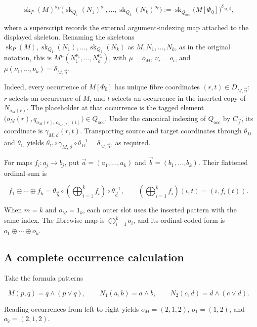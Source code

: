 \documentclass[11pt]{article}
\newcommand{\finord}[1]{\underline{#1}}
\begin{document}
\[
\operatorname{sk}_P(M)^{o_M}
\bigl(\operatorname{sk}_{Q_1}(N_1)^{o_1},\ldots,
      \operatorname{sk}_{Q_k}(N_k)^{o_k}\bigr)
:=\operatorname{sk}_{Q_{\mathrm{occ}}}\bigl(M[\Phi_0]\bigr)^{\delta_{M,\vec o}},
\]

where a superscript records the external argument-indexing map attached to the
displayed skeleton. Renaming the skeletons
\(\operatorname{sk}_P(M),\operatorname{sk}_{Q_1}(N_1),\ldots,
\operatorname{sk}_{Q_k}(N_k)\) as \(M,N_1,\ldots,N_k\), as in the original
notation, this is
\(M^\mu(N_1^{\nu_1},\ldots,N_k^{\nu_k})\), with
\(\mu=o_M\), \(\nu_i=o_i\), and
\(\mu(\nu_1,\ldots,\nu_k)=\delta_{M,\vec o}\).

Indeed, every occurrence of \(M[\Phi_0]\) has unique fibre coordinates
\((r,t)\in D_{M,\vec n}\): \(r\) selects an occurrence of \(M\), and \(t\)
selects an occurrence in the inserted copy of \(N_{o_M(r)}\). The placeholder
at that occurrence is the tagged element
\(\bigl(o_M(r),q_{o_M(r),\,o_{o_M(r)}(t)}\bigr)\in Q_{\mathrm{occ}}\).
Under the canonical indexing of \(Q_{\mathrm{occ}}\) by \(C_{\vec\ell}\), its
coordinate is \(\gamma_{M,\vec o}(r,t)\). Transporting source and target
coordinates through \(\theta_D\) and \(\theta_C\) yields
\(\theta_C\circ\gamma_{M,\vec o}\circ\theta_D^{-1}
=\delta_{M,\vec o}\), as required.

For maps \(f_i:\finord{a_i}\to\finord{b_i}\), put
\(\vec a=(a_1,\ldots,a_k)\) and \(\vec b=(b_1,\ldots,b_k)\). Their
flattened ordinal sum is

\[
f_1\oplus\cdots\oplus f_k
=\theta_{\vec b}\circ
 \left(\bigoplus_{i=1}^{k}f_i\right)
 \circ\theta_{\vec a}^{-1},
\qquad
\left(\bigoplus_{i=1}^{k}f_i\right)(i,t)=(i,f_i(t)).
\]

When \(m=k\) and \(o_M=1_{\finord k}\), each outer slot uses the inserted
pattern with the same index. The fibrewise map is
\(\bigoplus_{i=1}^{k}o_i\), and its ordinal-coded form is
\(o_1\oplus\cdots\oplus o_k\).

\subsection{A complete occurrence calculation}

Take the formula patterns

\[
M(p,q)=q\wedge(p\vee q),\qquad
N_1(a,b)=a\wedge b,
\qquad
N_2(c,d)=d\wedge(c\vee d).
\]

Reading occurrences from left to right yields
\(o_M=(2,1,2)\), \(o_1=(1,2)\), and \(o_2=(2,1,2)\).
\end{document}
